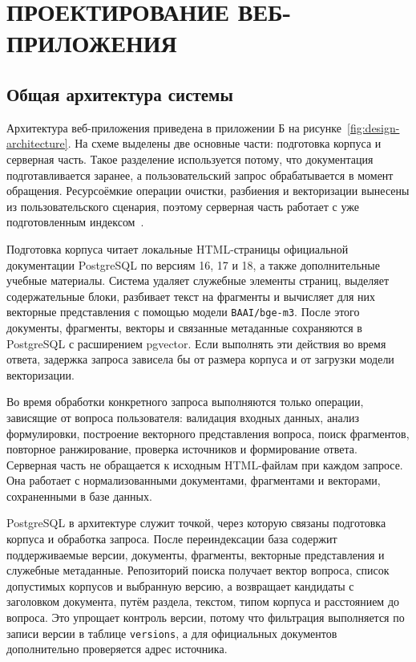 \chapter{{\fontsize{14pt}{21pt}\selectfont\MakeUppercase{Проектирование веб-приложения}}}
\label{cha:design}

\section{Общая архитектура системы}

Архитектура веб-приложения приведена в приложении Б на рисунке~\ref{fig:design-architecture}. На схеме выделены две основные части: подготовка корпуса и серверная часть. Такое разделение используется потому, что документация подготавливается заранее, а пользовательский запрос обрабатывается в момент обращения. Ресурсоёмкие операции очистки, разбиения и векторизации вынесены из пользовательского сценария, поэтому серверная часть работает с уже подготовленным индексом~\cite{martin2017,fowler2002,kleppmann2017}.

Подготовка корпуса читает локальные HTML-страницы официальной документации PostgreSQL по версиям 16, 17 и 18, а также дополнительные учебные материалы. Система удаляет служебные элементы страниц, выделяет содержательные блоки, разбивает текст на фрагменты и вычисляет для них векторные представления с помощью модели \texttt{BAAI/bge-m3}. После этого документы, фрагменты, векторы и связанные метаданные сохраняются в PostgreSQL с расширением pgvector. Если выполнять эти действия во время ответа, задержка запроса зависела бы от размера корпуса и от загрузки модели векторизации.

Во время обработки конкретного запроса выполняются только операции, зависящие от вопроса пользователя: валидация входных данных, анализ формулировки, построение векторного представления вопроса, поиск фрагментов, повторное ранжирование, проверка источников и формирование ответа. Серверная часть не обращается к исходным HTML-файлам при каждом запросе. Она работает с нормализованными документами, фрагментами и векторами, сохраненными в базе данных.

PostgreSQL в архитектуре служит точкой, через которую связаны подготовка корпуса и обработка запроса. После переиндексации база содержит поддерживаемые версии, документы, фрагменты, векторные представления и служебные метаданные. Репозиторий поиска получает вектор вопроса, список допустимых корпусов и выбранную версию, а возвращает кандидаты с заголовком документа, путём раздела, текстом, типом корпуса и расстоянием до вопроса. Это упрощает контроль версии, потому что фильтрация выполняется по записи версии в таблице \texttt{versions}, а для официальных документов дополнительно проверяется адрес источника.

